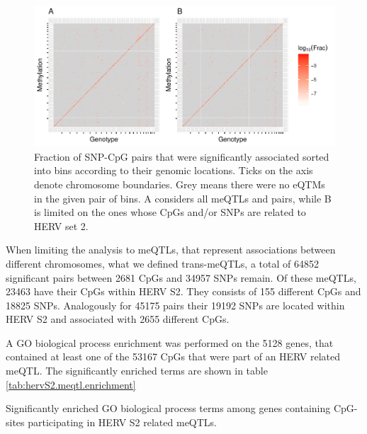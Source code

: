 \documentclass[a4paper,12pt,twoside,openright]{report}
\begin{document}
\begin{figure}[tb]
	\includegraphics[scale = 1, keepaspectratio = true]{../figures/meqtl_all_herv_heatmap}  
	\caption{Fraction of SNP-CpG pairs that were significantly associated sorted into bins according to their genomic locations. Ticks on the axis denote chromosome boundaries. Grey means there were no eQTMs in the given pair of bins. A considers all meQTLs and pairs, while B is limited on the ones whose CpGs and/or SNPs are related to HERV set 2.}
    \label{fig:global.meqtl.heatmap}
\end{figure}

When limiting the analysis to meQTLs, that represent associations between different chromosomes, what we defined trans-meQTLs, a total of 64852 significant pairs between 2681 CpGs and 34957 SNPs remain. Of these meQTLs, 23463 have their CpGs within HERV S2. They consists of 155 different CpGs and 18825 SNPs. Analogously for 45175 pairs their 19192 SNPs are located within HERV S2 and associated with 2655 different CpGs.

A GO biological process enrichment was performed on the 5128 genes, that contained at least one of the 53167 CpGs that were part of an HERV related meQTL. The significantly enriched terms are shown in table \ref{tab:hervS2.meqtl.enrichment}

\begin{table}[h!]
  \begin{center}
  \end{center}        
	\caption{Significantly enriched GO biological process terms among genes containing CpG-sites participating in HERV S2 related meQTLs.}
	\label{tab:hervS2.meqtl.enrichment}
\end{table}
\end{document}
